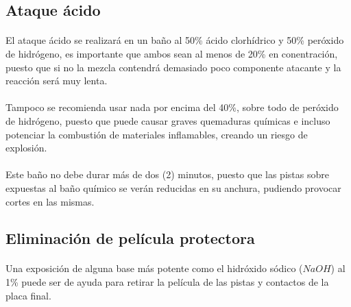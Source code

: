 \subsection{Ataque ácido}

\paragraph{} El ataque ácido se realizará en un baño al 50\% ácido clorhídrico y 50\% peróxido de hidrógeno, es importante que ambos sean al menos de 20\% en conentración, puesto que si no la mezcla contendrá demasiado poco componente atacante y la reacción será muy lenta.

\paragraph{} Tampoco se recomienda usar nada por encima del 40\%, sobre todo de peróxido de hidrógeno, puesto que puede causar graves quemaduras químicas e incluso potenciar la combustión de materiales inflamables, creando un riesgo de explosión.

\paragraph{} Este baño no debe durar más de dos (2) minutos, puesto que las pistas sobre expuestas al baño químico se verán reducidas en su anchura, pudiendo provocar cortes en las mismas.

\subsection{Eliminación de película protectora}

\paragraph{} Una exposición de alguna base más potente como el hidróxido sódico ($NaOH$) al 1\% puede ser de ayuda para retirar la película de las pistas y contactos de la placa final.
